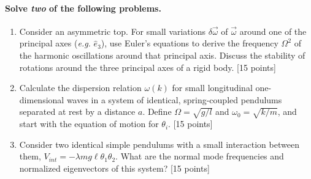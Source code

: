 \documentclass[letterpaper,11pt]{article}
\begin{document}
\paragraph{Solve \emph{two} of the following problems.}
\begin{enumerate}[resume]
 \item Consider an asymmetric top.  For small variations $\delta\vec\omega$ of $\vec\omega$ around one of the principal axes (\textit{e.g.} $\hat{e}_3$), use Euler's equations to derive the frequency $\Omega^2$ of the harmonic oscillations around that principal axis.  Discuss the stability of rotations around the three principal axes of a rigid body. [15 points]
 \item Calculate the dispersion relation $\omega(k)$ for small longitudinal one-dimensional waves in a system of identical, spring-coupled pendulums separated at rest by a distance $a$.  Define $\Omega = \sqrt{g/l}$ and $\omega_0 = \sqrt{k/m}$, and start with the equation of motion for $\theta_i$. [15 points]
 \item Consider two identical simple pendulums with a small interaction between them, $V_{int} = -\lambda mg\ell\theta_1\theta_2$.  What are the normal mode frequencies and normalized eigenvectors of this system? [15 points]
\end{enumerate}
\end{document}
